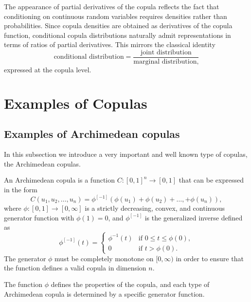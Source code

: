 \begin{remarkbox}
\begin{remarkT}[Interpretation]
The appearance of partial derivatives of the copula reflects the fact that
conditioning on continuous random variables requires densities rather than
probabilities. Since copula densities are obtained as derivatives of the copula
function, conditional copula distributions naturally admit representations in
terms of ratios of partial derivatives. This mirrors the classical identity
\[
\text{conditional distribution}
=
\frac{\text{joint distribution}}{\text{marginal distribution},
}
\]
expressed at the copula level.
\end{remarkT}
\end{remarkbox}


\section{Examples of Copulas}\label{sec:examplesa}
\subsection{Examples of Archimedean copulas}\label{subsec:archimedean}
In this subsection we introduce a very important and well known type of copulas, the Archimedean copulas.
\begin{definition}
\label{def:archimedean}
An Archimedean copula is a function $C : [0,1]^n \to [0,1]$ that can be expressed in the form
\begin{equation}
C(u_1, u_2, \dots, u_n) = \phi^{[-1]}(\phi(u_1) + \phi(u_2) + \dots, + \phi(u_n)),
\label{eq:archimedeandef}
\end{equation}
where $\phi : [0,1] \to [0,\infty]$ is a strictly decreasing, convex, and continuous generator function with $\phi(1) = 0$, and $\phi^{[-1]}$ is the generalized inverse defined as
\begin{equation}
\phi^{[-1]}(t) = \begin{cases}
\phi^{-1}(t) & \text{if } 0 \leq t \leq \phi(0), \\
0 & \text{if } t > \phi(0).
\end{cases}
\label{eq:generalizedinverse}
\end{equation}
The generator $\phi$ must be completely monotone on $[0,∞)$ in order to ensure that the function defines a valid copula in dimension $n$.
\end{definition}

The function $\phi$ defines the properties of the copula, and each type of Archimedean copula is determined by a specific generator function.

